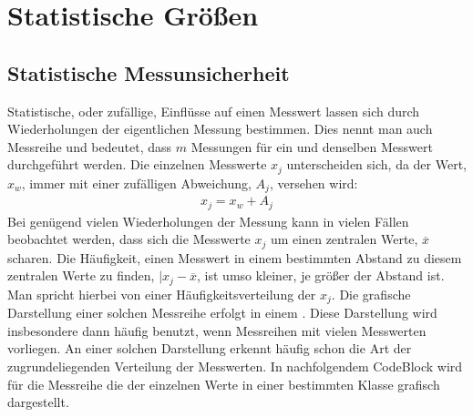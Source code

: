 \documentclass[letterpaper,10pt,english]{jupyterBook}
\begin{document}
\sphinxstepscope


\section{Statistische Größen}
\label{\detokenize{content/1_Mittelwert_StdAbw:statistische-groszen}}\label{\detokenize{content/1_Mittelwert_StdAbw::doc}}

\subsection{Statistische Messunsicherheit}
\label{\detokenize{content/1_Mittelwert_StdAbw:statistische-messunsicherheit}}
\sphinxAtStartPar
Statistische, oder zufällige, Einflüsse auf einen Messwert lassen sich durch Wiederholungen der eigentlichen Messung bestimmen. Dies nennt man auch Messreihe und bedeutet, dass \(m\) Messungen für ein und denselben Messwert durchgeführt werden. Die einzelnen Messwerte \(x_j\) unterscheiden sich, da der  Wert, \(x_w\), immer mit einer zufälligen Abweichung, \(A_j\),  versehen wird:
\begin{equation*}
\begin{split}x_j = x_w + A_j\end{split}
\end{equation*}
\sphinxAtStartPar
Bei genügend vielen Wiederholungen der Messung kann in vielen Fällen beobachtet werden, dass sich die Messwerte \(x_j\) um einen zentralen Werte, \(\overline x\) scharen. Die Häufigkeit, einen Messwert in einem bestimmten Abstand zu diesem zentralen Werte zu finden, \(|x_j - \overline x\), ist umso kleiner, je größer der Abstand ist. Man spricht hierbei von einer Häufigkeitsverteilung der \(x_j\). Die grafische Darstellung einer solchen Messreihe erfolgt in einem . Diese Darstellung wird insbesondere dann häufig benutzt, wenn Messreihen mit vielen Messwerten vorliegen. An einer solchen Darstellung erkennt häufig schon die Art der zugrundeliegenden Verteilung der Messwerten. In nachfolgendem Code\sphinxhyphen{}Block wird für die Messreihe die  der einzelnen Werte in einer bestimmten Klasse grafisch dargestellt.
\end{document}
